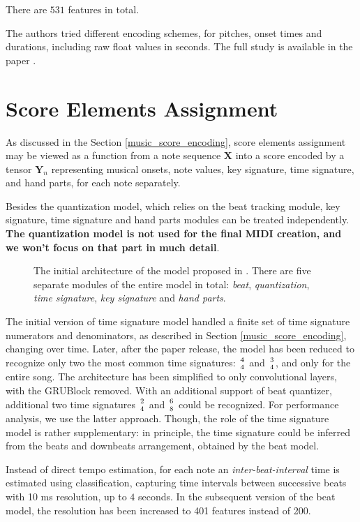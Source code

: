 There are $531$ features in total.

The authors tried different encoding schemes, for pitches, onset times and durations, including raw float values in seconds. The full study is available in the paper \cite{Liu2022}.

\section{Score Elements Assignment}

As discussed in the Section \ref{music_score_encoding}, score elements assignment may be viewed as a function from a note sequence $\mathbf{X}$ into a score encoded by a tensor $\mathbf{Y}_n$ representing musical onsets, note values, key signature, time signature, and hand parts, for each note separately.

Besides the quantization model, which relies on the beat tracking module, key signature, time signature and hand parts modules can be treated independently. \textbf{The quantization model is not used for the final MIDI creation, and we won't focus on that part in much detail}.

\begin{figure}[!ht]
\centering

\caption[The initial architecture of the model.]{The initial architecture of the model proposed in \cite{Liu2022}. There are five separate modules of the entire model in total: \emph{beat}, \emph{quantization}, \emph{time signature}, \emph{key signature} and \emph{hand parts}.}
\end{figure}

The initial version of time signature model handled a finite set of time signature numerators and denominators, as described in Section \ref{music_score_encoding}, changing over time. Later, after the paper release, the model has been reduced to recognize only two the most common time signatures: ${4 \atop 4}$ and ${3 \atop 4}$, and only for the entire song. The architecture has been simplified to only convolutional layers, with the GRUBlock removed. With an additional support of beat quantizer, additional two time signatures ${2 \atop 4}$ and ${6 \atop 8}$ could be recognized. For performance analysis, we use the latter approach. Though, the role of the time signature model is rather supplementary: in principle, the time signature could be inferred from the beats and downbeats arrangement, obtained by the beat model.

Instead of direct tempo estimation, for each note an \emph{inter-beat-interval} time is estimated using classification, capturing time intervals between successive beats with 10 ms resolution, up to $4$ seconds. In the subsequent version of the beat model, the resolution has been increased to 401 features instead of 200.

